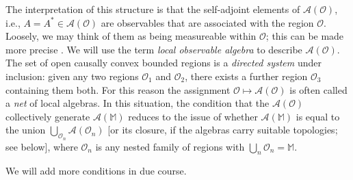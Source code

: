 \documentclass[12pt,a4paper]{article}
\newcommand{\1}{\mathds{1}}                         %
\newcommand{\Ocal}{\mathcal{O}}
\newcommand{\MM}{\mathbb{M}}
\newcommand{\Ac}{{\mathcal{A}}}
\begin{document}
	The interpretation of this structure is that the self-adjoint elements of $\Ac(\Ocal)$,
	i.e., $A=A^*\in\Ac(\Ocal)$ are observables that are associated with the region $\Ocal$.
	Loosely, we may think of them as being measureable within $\Ocal$; this can be made more precise \cite{FV:2018}. We will use the term \emph{local observable algebra} to describe $\Ac(\Ocal)$.
	The set of open causally convex bounded regions is a \emph{directed system} under inclusion: given any two regions $\Ocal_1$ and $\Ocal_2$, there exists a further region $\Ocal_3$ containing them both. For this reason the assignment $\Ocal\mapsto\Ac(\Ocal)$ is often called a \emph{net} of local algebras. In this situation, the condition that the $\Ac(\Ocal)$ collectively generate $\Ac(\MM)$ reduces to the issue of whether $\Ac(\MM)$ is equal to the union $\bigcup_{\Ocal_n}\Ac(\Ocal_n)$ [or its closure, if the algebras carry suitable topologies; see below], where $\Ocal_n$ is any nested family of regions with $\bigcup_n \Ocal_n=\MM$.
	
	We will add more conditions in due course.
\end{document}
